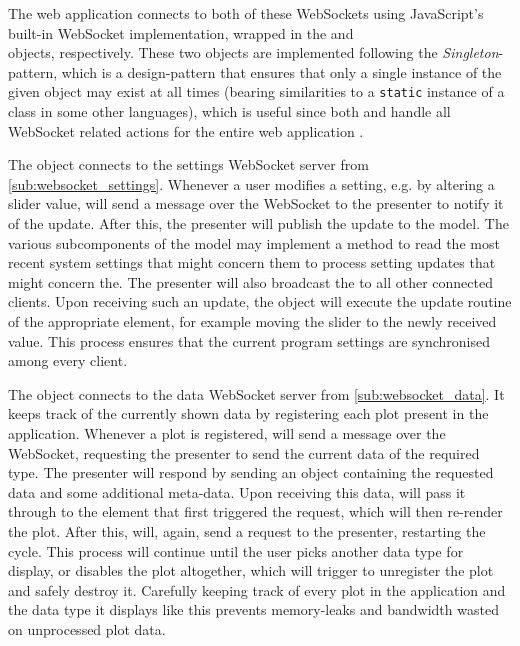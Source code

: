 \documentclass[a4paper, openany, oneside]{memoir}
\begin{document}
The web application connects to both of these WebSockets using JavaScript's built-in WebSocket implementation, wrapped in the  and \\ objects, respectively. These two objects are implemented following the \emph{Singleton}-pattern, which is a design-pattern that ensures that only a single instance of the given object may exist at all times (bearing similarities to a \texttt{static} instance of a class in some other languages), which is useful since both  and  handle all WebSocket related actions for the entire web application \cite[127]{designpatterns}.

The  object connects to the settings WebSocket server from \cref{sub:websocket_settings}. Whenever a user modifies a setting, e.g. by altering a slider value,  will send a message over the WebSocket to the presenter to notify it of the update.
After this, the presenter will publish the update to the model. The various subcomponents of the model may implement a method to read the most recent system settings that might concern them to process setting updates that might concern the.
The presenter will also broadcast the to all other connected clients. Upon receiving such an update, the  object will execute the update routine of the appropriate element, for example moving the slider to the newly received value. This process ensures that the current program settings are synchronised among every client.

The  object connects to the data WebSocket server from \cref{sub:websocket_data}. It keeps track of the currently shown data by registering each plot present in the application. Whenever a plot is registered,  will send a message over the WebSocket, requesting the presenter to send the current data of the required type. The presenter will respond by sending an object containing the requested data and some additional meta-data. Upon receiving this data,  will pass it through to the element that first triggered the request, which will then re-render the plot. After this,  will, again, send a request to the presenter, restarting the cycle. This process will continue until the user picks another data type for display, or disables the plot altogether, which will trigger  to unregister the plot and safely destroy it. Carefully keeping track of every plot in the application and the data type it displays like this prevents memory-leaks and bandwidth wasted on unprocessed plot data.
\end{document}
